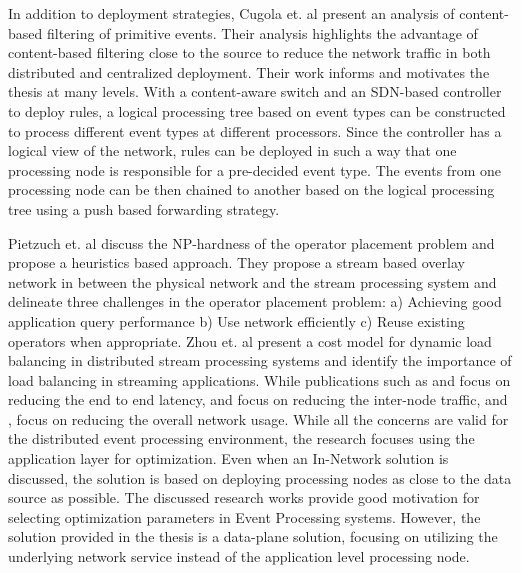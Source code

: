 In addition to deployment strategies, Cugola et. al present an analysis of content-based filtering of primitive events. Their analysis highlights the advantage of content-based filtering close to the source to reduce the network traffic in both distributed and centralized deployment. Their work informs and motivates the thesis at many levels. With a content-aware switch and an SDN-based controller to deploy rules, a logical processing tree based on event types can be constructed to process different event types at different processors.  Since the controller has a logical view of the network, rules can be deployed in such a way that one processing node is responsible for a pre-decided event type. The events from one processing node can be then chained to another based on the logical processing tree using a push based forwarding strategy.\newline 

Pietzuch et. al \cite{pietzuch2006network} discuss the NP-hardness of the operator placement problem and propose a heuristics based approach. They propose a stream based overlay network in between the physical network and the stream processing system and delineate three challenges in the operator placement problem: a) Achieving good application query performance b) Use network efficiently c) Reuse existing operators when appropriate. Zhou et. al \cite{zhou2006efficient} present a cost model for dynamic load balancing in distributed stream processing systems and identify the importance of load balancing in streaming applications. While publications such as \cite{backman2012managing} and \cite{chatzistergiou2014fast} focus on reducing the end to end latency, \cite{aniello2013adaptive} and \cite{cui2016big} focus on reducing the inter-node traffic, and \cite{rizou2010solving}, \cite{pietzuch2006network} focus on reducing the overall network usage. While all the concerns are valid for the distributed event processing environment, the research focuses using the application layer for optimization. Even when an In-Network solution is discussed, the solution is based on deploying processing nodes as close to the data source as possible. The discussed research works provide good motivation for selecting optimization parameters in Event Processing systems. However, the solution provided in the thesis is a data-plane solution, focusing on utilizing the underlying network service instead of the application level processing node.


